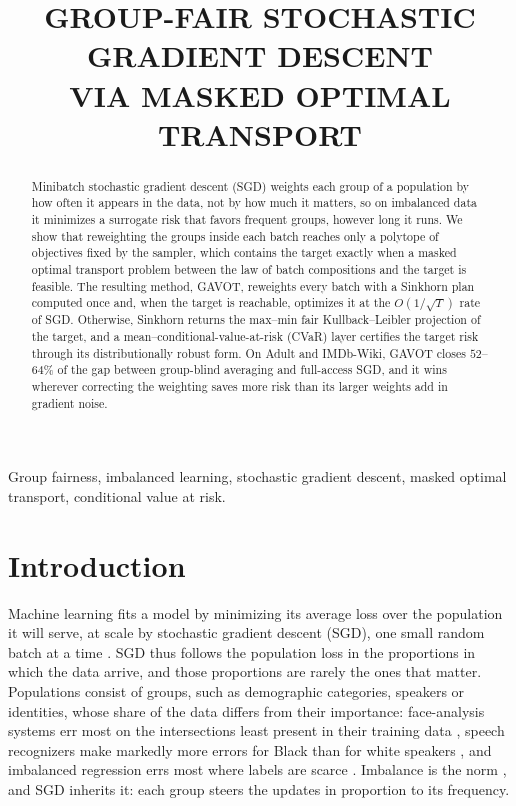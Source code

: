 \documentclass{article}
\title{GROUP-FAIR STOCHASTIC GRADIENT DESCENT \\ VIA MASKED OPTIMAL TRANSPORT}
\theoremstyle{definition}
\newcommand{\avot}{\textsf{GAVOT}}
\begin{document}
\ninept
\maketitle
\pagestyle{empty}\thispagestyle{empty}

\begin{abstract}
Minibatch stochastic gradient descent (SGD) weights each group of a
population by how often it appears in the data, not by how much it
matters, so on imbalanced data it minimizes a surrogate risk that favors
frequent groups, however long it runs. We show that reweighting the groups
inside each batch reaches only a polytope of objectives fixed by the
sampler, which contains the target exactly when a masked optimal transport
problem between the law of batch compositions and the target is feasible.
The resulting method, \avot{}, reweights every batch with a Sinkhorn plan
computed once and, when the target is reachable, optimizes it at the
$O(1/\sqrt{T})$ rate of SGD. Otherwise, Sinkhorn returns the max--min fair
Kullback--Leibler projection of the target, and a
mean--conditional-value-at-risk (CVaR) layer certifies the target risk
through its distributionally robust form. On Adult and IMDb-Wiki, \avot{}
closes $52$--$64\%$ of the gap between group-blind averaging and
full-access SGD, and it wins wherever correcting the weighting saves more
risk than its larger weights add in gradient noise.
\end{abstract}

\begin{keywords}
Group fairness, imbalanced learning, stochastic gradient descent, masked
optimal transport, conditional value at risk.
\end{keywords}

\vspace{-4pt}\section{Introduction}
\label{sec:intro}

Machine learning fits a model by minimizing its average loss over the
population it will serve, at scale by stochastic gradient descent (SGD),
one small random batch at a time \cite{nemirovski2009,bottou2018optimization}.
SGD thus follows the population loss in the proportions in which the data
arrive, and those proportions are rarely the ones that matter.
Populations consist of groups, such as demographic categories, speakers
or identities, whose share of the data differs from their importance:
face-analysis systems err most on the intersections least present in
their training data \cite{buolamwini2018gender}, speech recognizers make
markedly more errors for Black than for white speakers
\cite{koenecke2020speech}, and imbalanced regression errs most where labels
are scarce \cite{yang2021dir}. Imbalance is the norm
\cite{he2009imbalanced}, and SGD inherits it: each group steers the updates
in proportion to its frequency.
\end{document}
